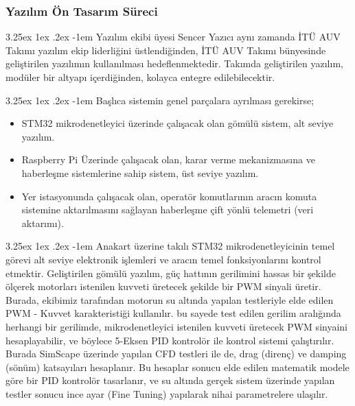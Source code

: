 \documentclass[12pt]{article}
\makeatletter
\newcounter{subsubsubsection}[subsubsection]
\renewcommand\paragraph{\@startsection{paragraph}{5}{\z@}%
  {3.25ex \@plus1ex \@minus.2ex}%
  {-1em}%
  {\normalfont\normalsize\bfseries}}
\makeatother
\begin{document}
\newpage
\subsubsection{Yazılım Ön Tasarım Süreci}


\paragraph{} Yazılım ekibi üyesi Sencer Yazıcı aynı zamanda İTÜ AUV Takımı yazılım ekip liderliğini üstlendiğinden, İTÜ AUV Takımı bünyesinde geliştirilen yazılımın kullanılması hedeflenmektedir. Takımda geliştirilen yazılım, modüler bir altyapı içerdiğinden, kolayca entegre edilebilecektir.

\paragraph{} Başlıca sistemin genel parçalara ayrılması gerekirse;
\begin{itemize}
    \item STM32 mikrodenetleyici üzerinde çalışacak olan gömülü sistem, alt seviye yazılım.
    \item Raspberry Pi Üzerinde çalışacak olan, karar verme mekanizmasına ve haberleşme sistemlerine sahip sistem, üst seviye yazılım.
    \item Yer istasyonunda çalışacak olan, operatör komutlarının aracın komuta sistemine aktarılmasını sağlayan haberleşme çift yönlü telemetri (veri aktarımı).
\end{itemize}


 \paragraph{}  Anakart üzerine takılı STM32 mikrodenetleyicinin temel görevi alt seviye elektronik işlemleri ve aracın temel fonksiyonlarını kontrol etmektir. Geliştirilen gömülü yazılım, güç hattının gerilimini hassas bir şekilde ölçerek motorları istenilen kuvveti üretecek şekilde bir PWM sinyali üretir. Burada, ekibimiz tarafından motorun su altında yapılan testleriyle elde edilen PWM - Kuvvet karakteristiği kullanılır. bu sayede test edilen gerilim aralığında herhangi bir gerilimde, mikrodenetleyici istenilen kuvveti üretecek PWM sinyaini hesaplayabilir, ve böylece 5-Eksen PID kontrolör ile kontrol sistemi çalıştırılır. Burada SimScape üzerinde yapılan CFD testleri ile de, drag (direnç) ve damping (sönüm) katsayıları hesaplanır. Bu hesaplar sonucu elde edilen matematik modele göre bir PID kontrolör tasarlanır, ve su altında gerçek sistem üzerinde yapılan testler sonucu ince ayar (Fine Tuning) yapılarak nihai parametrelere ulaşılır. 
\end{document}
